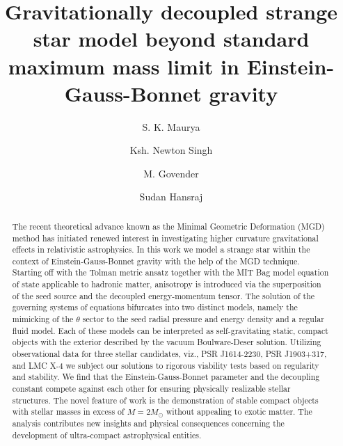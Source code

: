 \documentclass[]{aastex631}
\begin{document}
\title{Gravitationally decoupled strange star model beyond standard maximum mass limit in Einstein-Gauss-Bonnet gravity}



\author[0000-0003-4089-3651]{S. K. Maurya}

\author[0000-0001-9778-4101]{Ksh. Newton Singh}

\author[0000-0001-6110-9526]{M. Govender}

\author[0000-0000-0000-0000]{Sudan Hansraj}


\begin{abstract}
The recent theoretical advance known as the Minimal Geometric Deformation (MGD) method has initiated renewed interest in investigating higher curvature gravitational effects in relativistic astrophysics. In this work we model a strange star within the context of Einstein-Gauss-Bonnet gravity with the help of the MGD technique. Starting off with the Tolman metric ansatz together with the MIT Bag model equation of state applicable to hadronic matter, anisotropy is introduced via the superposition of the seed source and the decoupled energy-momentum tensor. The solution of the governing systems of equations bifurcates into two distinct models, namely the mimicking of the $\theta$ sector to the seed radial pressure and energy density and a regular fluid model. Each of these models can be interpreted as self-gravitating static, compact objects with the exterior described by the vacuum  Boulware-Deser solution. Utilizing observational data for three stellar candidates, viz., PSR J1614-2230, PSR J1903+317, and LMC X-4 we subject our solutions to rigorous viability tests based on regularity and stability. We find that the Einstein-Gauss-Bonnet parameter and the decoupling constant compete against each other for ensuring physically realizable stellar structures. The novel feature of work is the demonstration of stable compact objects with stellar masses in excess of $M= 2 M_{\odot}$ without appealing to exotic matter. The analysis contributes new insights and physical consequences concerning the development of ultra-compact astrophysical entities.
\end{abstract}
\end{document}
